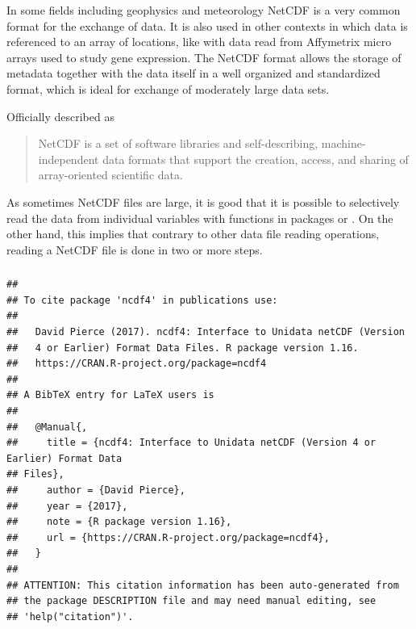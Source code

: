 \documentclass[krantz2]{krantz}\usepackage{knitr}%
\begin{document}
In some fields including geophysics and meteorology NetCDF is a very common format for the exchange of data. It is also used in other contexts in which data is referenced to an array of locations, like with data read from Affymetrix micro arrays used to study gene expression. The NetCDF format allows the storage of metadata together with the data itself in a well organized and standardized format, which is ideal for exchange of moderately large data sets.

Officially described as
\begin{quote}
NetCDF is a set of software libraries and self-describing, machine-independent data formats that support the creation, access, and sharing of array-oriented scientific data.
\end{quote}

As sometimes NetCDF files are large, it is good that it is possible to selectively read the data from individual variables with functions in packages  or . On the other hand, this implies that contrary to other data file reading operations, reading a NetCDF file is done in two or more steps.

\subsubsection[ncdf4]{}

\begin{knitrout}\footnotesize
{}\color{fgcolor}\begin{kframe}
\begin{alltt}
\hlstd{(} \hlstd{=} \hlstd{)}
\end{alltt}
\begin{verbatim}
## 
## To cite package 'ncdf4' in publications use:
## 
##   David Pierce (2017). ncdf4: Interface to Unidata netCDF (Version
##   4 or Earlier) Format Data Files. R package version 1.16.
##   https://CRAN.R-project.org/package=ncdf4
## 
## A BibTeX entry for LaTeX users is
## 
##   @Manual{,
##     title = {ncdf4: Interface to Unidata netCDF (Version 4 or Earlier) Format Data
## Files},
##     author = {David Pierce},
##     year = {2017},
##     note = {R package version 1.16},
##     url = {https://CRAN.R-project.org/package=ncdf4},
##   }
## 
## ATTENTION: This citation information has been auto-generated from
## the package DESCRIPTION file and may need manual editing, see
## 'help("citation")'.
\end{verbatim}
\end{kframe}
\end{knitrout}
\end{document}
